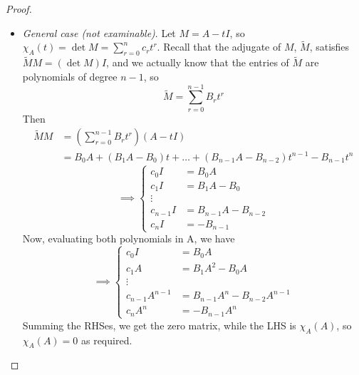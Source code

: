 \documentclass{../template/note}
\begin{document}
\begin{proof}
\begin{itemize}
\[\begin{pmatrix}
                 \chi_A(\lambda_1) & \cdots & 0 \\
                 \vdots & \ddots & \vdots \\
                 0 & \cdots & \chi_A(\lambda_n) \\
                \end{pmatrix} = 0
            \]
            where 0 is the zero matrix. Then, since \(A = PDP^{-1}\), we have \(A = PD^rP^{-1}\), and so
            \begin{align*}
                \chi_A(A) &= \chi_A(PDP^{-1}) \\
                &= P\chi_A(D)P^{-1} \\
                &= 0
            \end{align*}
            \item \emph{General case (not examinable)}. Let \(M = A - tI\), so \(\chi_A(t) = \det M = \sum_{r=0}^n c_rt^r\). Recall that the adjugate of \(M\), \(\tilde M\), satisfies \(\tilde MM = (\det M)I\), and we actually know that the entries of \(\tilde M\) are polynomials of degree \(n-1\), so
            \[
                \tilde M = \sum_{r=0}^{n-1} B_r t^r
            \]
            Then
            \begin{align*}
                \tilde MM &= \left(\sum_{r=0}^{n-1} B_r t^r\right)(A - tI) \\
                &= B_0A + (B_1A - B_0)t + \dots + (B_{n-1}A - B_{n-2})t^{n-1} - B_{n-1}t^n
            \end{align*}
            \[
                \implies \begin{cases}
                    c_0I &= B_0A \\
                    c_1I &= B_1A-B_0 \\
                    \vdots \\
                    c_{n-1}I &= B_{n-1}A - B_{n-2} \\
                    c_nI &= -B_{n-1}
                \end{cases}
            \]
            Now, evaluating both polynomials in A, we have
            \[
                \implies \begin{cases}
                    c_0I &= B_0A \\
                    c_1A &= B_1A^2-B_0A \\
                    \vdots \\
                    c_{n-1}A^{n-1} &= B_{n-1}A^n - B_{n-2}A^{n-1} \\
                    c_nA^n &= -B_{n-1}A^n
                \end{cases}
            \]
            Summing the RHSes, we get the zero matrix, while the LHS is \(\chi_A(A)\), so \(\chi_A(A) = 0\) as required.
        \end{itemize}
    \end{proof}
    
\end{document}
